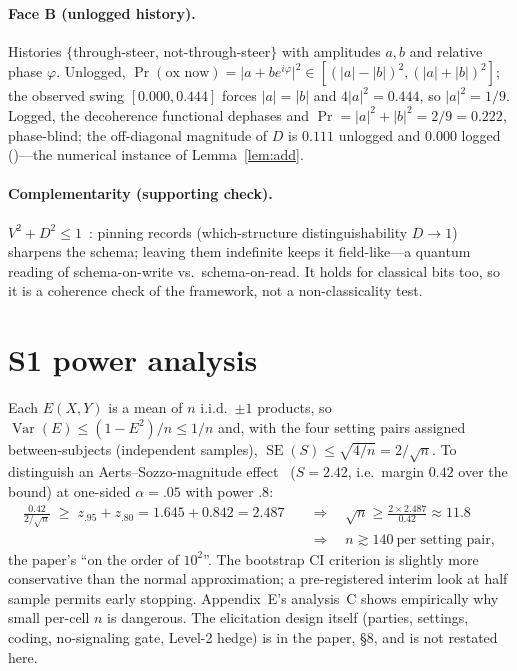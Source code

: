 \documentclass[11pt]{article}
\theoremstyle{definition}
\begin{document}
\paragraph{Face B (unlogged history).}
Histories $\{$through-steer, not-through-steer$\}$ with amplitudes $a,b$ and relative phase $\varphi$. Unlogged, $\Pr(\text{ox now})=\lvert a+be^{i\varphi}\rvert^2\in[(\lvert a\rvert-\lvert b\rvert)^2,(\lvert a\rvert+\lvert b\rvert)^2]$; the observed swing $[0.000,0.444]$ forces $\lvert a\rvert=\lvert b\rvert$ and $4\lvert a\rvert^2=0.444$, so $\lvert a\rvert^2=1/9$. Logged, the decoherence functional dephases and $\Pr=\lvert a\rvert^2+\lvert b\rvert^2=2/9=0.222$, phase-blind; the off-diagonal magnitude of $D$ is $0.111$ unlogged and $0.000$ logged ()---the numerical instance of Lemma~\ref{lem:add}.

\paragraph{Complementarity (supporting check).}
$V^2+D^2\le1$~\cite{englert1996}: pinning records (which-structure distinguishability $D\to1$) sharpens the schema; leaving them indefinite keeps it field-like---a quantum reading of schema-on-write vs.\ schema-on-read. It holds for classical bits too, so it is a coherence check of the framework, not a non-classicality test.

\section{S1 power analysis}
Each $E(X,Y)$ is a mean of $n$ i.i.d.\ $\pm1$ products, so $\operatorname{Var}(E)\le(1-E^2)/n\le1/n$ and, with the four setting pairs assigned between-subjects (independent samples), $\operatorname{SE}(S)\le\sqrt{4/n}=2/\sqrt n$. To distinguish an Aerts--Sozzo-magnitude effect~\cite{aerts2011} ($S=2.42$, i.e.\ margin $0.42$ over the bound) at one-sided $\alpha=.05$ with power $.8$:
\begin{align*}
\frac{0.42}{2/\sqrt n}\;\ge\; z_{.95}+z_{.80}=1.645+0.842=2.487
\quad&\Longrightarrow\quad
\sqrt n\ge\frac{2\times2.487}{0.42}\approx11.8\\
&\Longrightarrow\quad
n\gtrsim140\ \text{per setting pair},
\end{align*}
the paper's ``on the order of $10^2$''. The bootstrap CI criterion is slightly more conservative than the normal approximation; a pre-registered interim look at half sample permits early stopping. Appendix~E's analysis~C shows empirically why small per-cell $n$ is dangerous. The elicitation design itself (parties, settings, coding, no-signaling gate, Level-2 hedge) is in the paper, \S8, and is not restated here.
\end{document}
